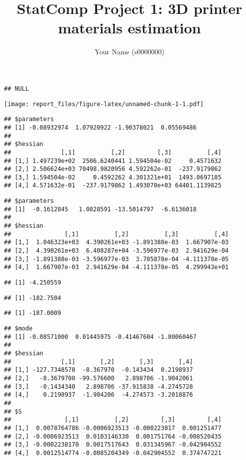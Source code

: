 \documentclass[
]{article}
\title{StatComp Project 1: 3D printer materials estimation}
\author{Your Name (s0000000)}
\date{}
\begin{document}
\maketitle

\begin{verbatim}
## NULL
\end{verbatim}

\texttt{[image: report\_files/figure-latex/unnamed-chunk-1-1.pdf]}

\begin{verbatim}
## $parameters
## [1] -0.08932974  1.07920922 -1.90378021  0.05569486
## 
## $hessian
##              [,1]          [,2]         [,3]          [,4]
## [1,] 1.497239e+02  2506.6240441 1.594504e-02     0.4571632
## [2,] 2.506624e+03 70498.9820956 4.592262e-01  -237.9179862
## [3,] 1.594504e-02     0.4592262 4.301321e+01  1493.0697185
## [4,] 4.571632e-01  -237.9179862 1.493070e+03 64401.1139825
\end{verbatim}

\begin{verbatim}
## $parameters
## [1]  -0.1612845   1.0828591 -13.5014797  -6.6136018
## 
## $hessian
##               [,1]          [,2]          [,3]          [,4]
## [1,]  1.046323e+03  4.390261e+03 -1.891388e-03  1.667907e-03
## [2,]  4.390261e+03  6.408287e+04 -3.596977e-03  2.941629e-04
## [3,] -1.891388e-03 -3.596977e-03  3.785878e-04 -4.111378e-05
## [4,]  1.667907e-03  2.941629e-04 -4.111378e-05  4.299943e+01
\end{verbatim}

\begin{verbatim}
## [1] -4.250559
\end{verbatim}

\begin{verbatim}
## [1] -182.7504
\end{verbatim}

\begin{verbatim}
## [1] -187.0009
\end{verbatim}

\begin{verbatim}
## $mode
## [1] -0.08571000  0.01445975 -0.41467604 -1.80060467
## 
## $hessian
##              [,1]       [,2]       [,3]       [,4]
## [1,] -127.7348578  -8.367970  -0.143434  0.2198937
## [2,]   -8.3679700 -99.576600   2.898706 -1.9042061
## [3,]   -0.1434340   2.898706 -37.915838 -4.2745728
## [4,]    0.2198937  -1.904206  -4.274573 -3.2018876
## 
## $S
##               [,1]          [,2]         [,3]         [,4]
## [1,]  0.0078764786 -0.0006923513 -0.000223817  0.001251477
## [2,] -0.0006923513  0.0103146330  0.001751764 -0.008520435
## [3,] -0.0002238170  0.0017517643  0.031345967 -0.042904552
## [4,]  0.0012514774 -0.0085204349 -0.042904552  0.374747221
\end{verbatim}
\end{document}
